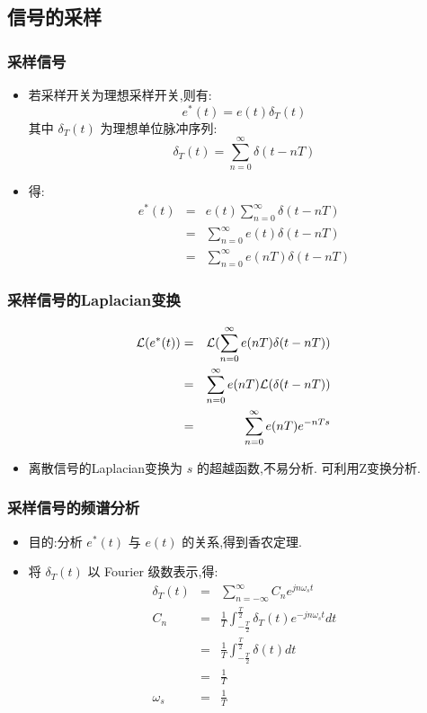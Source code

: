 \documentclass[table]{article}
\begin{document}
\subsection{信号的采样}
\label{sec-2-1}
\begin{frame}
\frametitle{采样信号}
\label{sec-2-1-1}

\begin{itemize}
\item <2->若采样开关为理想采样开关,则有:  
       	\[e^*(t)=e(t)\delta_T(t)\]
      其中  $\delta_T(t)$  为理想单位脉冲序列:  
	       \[\delta_T(t)=\sum_{n=0}^{\infty}\delta(t-nT)\]
\item <3->得:
      \begin{eqnarray*}
      e^{*}(t) & = & e(t)\sum_{n=0}^{\infty}\delta(t-nT) \\
       	&=&  \sum_{n=0}^{\infty}e(t)\delta(t-nT) \\
       	&=&  \sum_{n=0}^{\infty}e(nT)\delta(t-nT) 
      \end{eqnarray*}
\end{itemize}
\end{frame}
\begin{frame}
\frametitle{采样信号的Laplacian变换}
\label{sec-2-1-2}

      \begin{eqnarray*}
      {\cal L}(e^{*}(t)) & =  & {\cal L}( \sum_{n=0}^{\infty}e(nT)\delta(t-nT) )\\
      &=&  \sum_{n=0}^{\infty}e(nT){\cal L}(\delta(t-nT) )\\
      &=&  \sum_{n=0}^{\infty}e(nT)e^{-nTs}
      \end{eqnarray*}
\begin{itemize}
\item <2->离散信号的Laplacian变换为  $s$  的超越函数,不易分析. 可利用Z变换分析.
\end{itemize}
\end{frame}
\begin{frame}
\frametitle{采样信号的频谱分析}
\label{sec-2-1-3}

\begin{itemize}
\item 目的:分析  $e^*(t)$  与  $e(t)$  的关系,得到香农定理.
\item <2->将  $\delta_T(t)$  以 Fourier 级数表示,得: 
       \begin{eqnarray*}
       \delta_T(t) & = &\sum_{n=-\infty}^{\infty}C_n e^{jn\omega_s t} \\
       C_n &=&\frac{1}{T}\int_{-\frac{T}{2}}^{\frac{T}{2}}\delta_T(t)e^{-jn\omega_s t}dt \\
         &=&\frac{1}{T}\int_{-\frac{T}{2}}^{\frac{T}{2}}\delta(t)dt \\ 
         &=& \frac{1}{T} \\
       \omega_s &=& \frac{1}{T} 
     \end{eqnarray*}
\end{itemize}
\end{frame}
\end{document}
